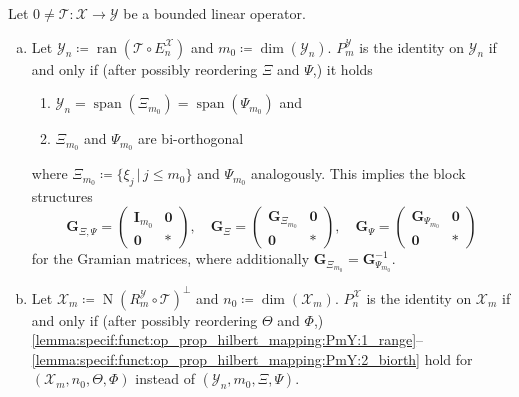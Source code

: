 \documentclass[a4paper]{paper}
\newcommand*{\SPC}[1]{{\ensuremath{\mathscr{#1}}}}
\newcommand*{\SPCX}{\SPC{X}}
\newcommand*{\SPCY}{\SPC{Y}}
\newcommand*{\OP}[1]{{\ensuremath{\mathcal{#1}}}}
\newcommand*{\OPT}{\OP{T}}
\newcommand*{\EXT}[2]{\ensuremath{E_{#1}^{#2}}}
\newcommand*{\REST}[2]{\ensuremath{R_{#1}^{#2}}}
\newcommand*{\PROJ}[2]{\ensuremath{P_{#1}^{#2}}}
\newcommand*{\RmY}{{\ensuremath{\REST{m}{\SPC{Y}}}}}
\newcommand*{\EnX}{{\ensuremath{\EXT{n}{\SPC{X}}}}}
\newcommand*{\PnX}{{\ensuremath{\PROJ{n}{\SPCX}}}}
\newcommand*{\PmY}{{\ensuremath{\PROJ{m}{\SPCY}}}}
\DeclareMathOperator{\RANGE}{{ran}}
\DeclareMathOperator{\NULL}{{N}}
\DeclareMathOperator{\SPAN}{{span}}
\DeclareMathOperator{\DIM}{{dim}}
\DeclareMathOperator{\DEFEQ}{{\coloneqq}}
\newcommand*{\BDZERO}{\boldsymbol{0}}
\newcommand*{\BDG}{\boldsymbol{G}}
\newcommand*{\BDI}{\boldsymbol{I}}
\begin{document}
\begin{lemma}
 \label{lemma:specif:funct:op_prop_hilbert_mapping}
 Let $0 \neq \OPT\colon \SPCX \to \SPCY$ be a bounded linear operator. 
 
 \begin{enumerate}[(a)]
  \item \label{lemma:specif:funct:op_prop_hilbert_mapping:PmY}
  Let $\SPCY_n \DEFEQ  \RANGE(\OPT \circ \EnX)$ and $m_0 \DEFEQ  \DIM(\SPCY_n)$. $\PmY$ is the identity on 
  $\SPCY_n$ if and only if (after possibly reordering $\Xi$ and $\Psi$,) it holds
  \begin{enumerate}[({a}1)]
   \item \label{lemma:specif:funct:op_prop_hilbert_mapping:PmY:1_range}
   $\SPCY_n = \SPAN(\Xi_{m_0}) = \SPAN(\Psi_{m_0})$ and
   \item \label{lemma:specif:funct:op_prop_hilbert_mapping:PmY:2_biorth}
   $\Xi_{m_0}$ and $\Psi_{m_0}$ are bi-orthogonal
  \end{enumerate}
  where $\Xi_{m_0} \DEFEQ  \{ \xi_j\, |\, j\leq m_0 \}$ and $\Psi_{m_0}$ analogously. This implies the block 
  structures
  \renewcommand{\arraystretch}{1.1}
  \begin{equation*}
   \BDG_{\Xi, \Psi} =
   \left(
   \begin{array}{c|c}
    \BDI_{m_0} & \BDZERO \\[2pt]
    \hline
    \BDZERO & \boldsymbol{\ast}
   \end{array}
   \right),
   \quad
   \BDG_\Xi =
   \left(
   \begin{array}{c|c}
    \BDG_{\Xi_{m_0}} & \BDZERO \\[2pt]
    \hline
    \BDZERO & \boldsymbol{\ast}
   \end{array}
   \right),
   \quad
   \BDG_\Psi =
   \left(
   \begin{array}{c|c}
    \BDG_{\Psi_{m_0}} & \BDZERO \\[2pt]
    \hline
    \BDZERO & \boldsymbol{\ast}
   \end{array}
   \right)
  \end{equation*}
  \renewcommand{\arraystretch}{1.0}
  for the Gramian matrices, where additionally $\BDG_{\Xi_{m_0}} = \BDG_{\Psi_{m_0}}^{-1}$. 

  \item \label{lemma:specif:funct:op_prop_hilbert_mapping:PnX}
  Let $\SPCX_m \DEFEQ  \NULL(\RmY \circ \OPT)^\perp$ and $n_0 \DEFEQ  \DIM(\SPCX_m)$. $\PnX$ is the identity on   
  $\SPCX_m$ if and only if (after possibly reordering $\Theta$ and $\Phi$,)
  \eqref{lemma:specif:funct:op_prop_hilbert_mapping:PmY:1_range}--%
  \eqref{lemma:specif:funct:op_prop_hilbert_mapping:PmY:2_biorth}
  hold for $(\SPCX_m, n_0, \Theta, \Phi)$ instead of $(\SPCY_n, m_0, \Xi, \Psi)$.
 \end{enumerate}

\end{lemma}
\vspace{1em}
\end{document}
